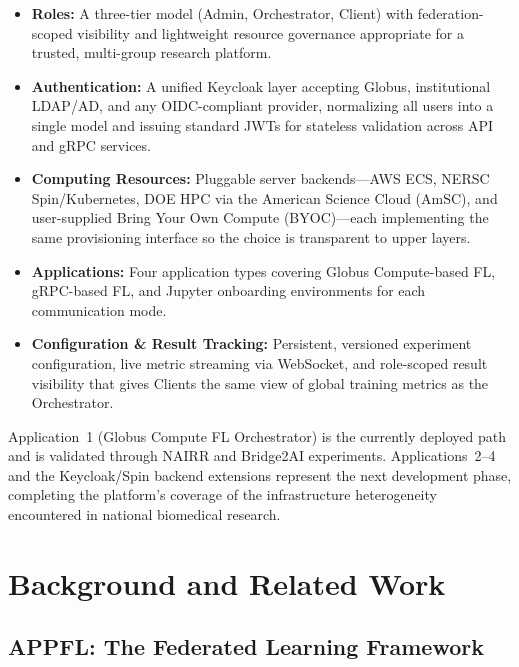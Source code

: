 \documentclass[conference]{IEEEtran}
\begin{document}
\begin{itemize}
  \item \textbf{Roles:} A three-tier model (Admin, Orchestrator,
  Client) with federation-scoped visibility and lightweight resource
  governance appropriate for a trusted, multi-group research platform.

  \item \textbf{Authentication:} A unified Keycloak layer accepting
  Globus, institutional LDAP/AD, and any OIDC-compliant provider,
  normalizing all users into a single model and issuing standard JWTs
  for stateless validation across API and gRPC services.

  \item \textbf{Computing Resources:} Pluggable server backends---AWS
  ECS, NERSC Spin/Kubernetes, DOE HPC via the American Science Cloud
  (AmSC), and user-supplied Bring Your Own Compute (BYOC)---each
  implementing the same provisioning interface so the choice is
  transparent to upper layers.

  \item \textbf{Applications:} Four application types covering
  Globus Compute-based FL, gRPC-based FL, and Jupyter onboarding
  environments for each communication mode.

  \item \textbf{Configuration \& Result Tracking:} Persistent,
  versioned experiment configuration, live metric streaming via
  WebSocket, and role-scoped result visibility that gives Clients the
  same view of global training metrics as the Orchestrator.
\end{itemize}

Application~1 (Globus Compute FL Orchestrator) is the currently
deployed path and is validated through NAIRR and Bridge2AI experiments.
Applications~2--4 and the Keycloak/Spin backend extensions represent
the next development phase, completing the platform's coverage of the
infrastructure heterogeneity encountered in national biomedical
research.

\section{Background and Related Work}

\subsection{APPFL: The Federated Learning Framework}
\end{document}
